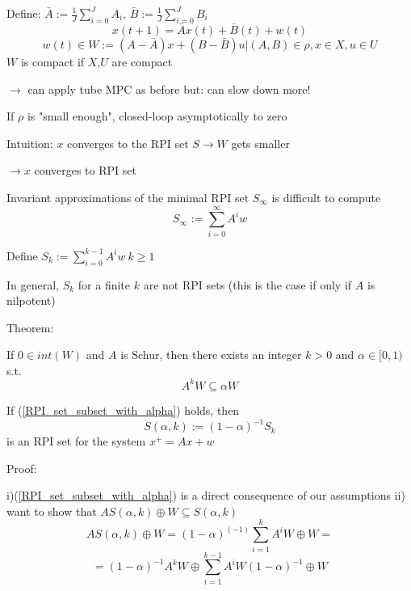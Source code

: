 Define: $\bar{A} := \frac{1}{J}\sum_{i=0}^{J}A_i$, $\bar{B} := \frac{1}{J}\sum_{i=0}^{J}B_i$
\begin{equation*}
x(t+1) = \bar{A}x(t) + \bar{B}(t) + w(t)
\end{equation*}
\begin{equation*}
w(t) \in W := {(A-\bar{A})x + (B-\bar{B})u | (A,B) \in \rho, x \in X, u \in U}
\end{equation*}
$W$ is compact if $X$,$U$ are compact

$\rightarrow$ can apply tube MPC as before
but: can slow down more!

If $\rho$ is "small enough", closed-loop asymptotically to zero

Intuition: $x$ converges to the RPI set $S \rightarrow W$ gets smaller 

$\rightarrow x$ converges to RPI set

Invariant approximations of the minimal RPI set $S_{\infty}$ is difficult to compute
\begin{equation*}
S_{\infty} := \sum_{i=0}^{\infty}A^iw
\end{equation*}

Define $S_k := \sum_{i=0}^{k-1}A^iw \ k \geq 1$

In general, $S_k$ for a finite $k$ are not RPI sets (this is the case if only if $A$ is nilpotent)

Theorem:

If $0 \in int(W)$ and $A$ is Schur, then there exists an integer $k > 0$ and $\alpha \in [0,1)$ s.t.
\begin{equation}\label{RPI_set_subset_with_alpha}
A^kW \subseteq \alpha W
\end{equation} 

If (\ref{RPI_set_subset_with_alpha}) holds, then 
\begin{equation*}
S(\alpha,k) := (1-\alpha)^{-1}S_k
\end{equation*}
is an RPI set for the system $x^+ = Ax + w$

Proof:

i)(\ref{RPI_set_subset_with_alpha}) is a direct consequence of our assumptions
ii) want to show that $AS(\alpha,k) \oplus W \subseteq S(\alpha,k)$
\begin{equation*}
AS(\alpha,k) \oplus W = (1-\alpha)^(-1) \sum_{i=1}^{k} A^iW \oplus W= 
\end{equation*}
\begin{equation*}
= (1 - \alpha)^{-1} A^kW \oplus \sum_{i=1}^{k-1}A^iW(1-\alpha)^{-1} \oplus W
\end{equation*}

